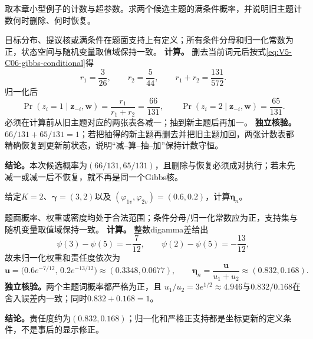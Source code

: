 \label{struct:V5-C06-CH32}
\begin{example}[一次折叠Gibbs更新]\label{exm:V5-C06-gibbs-step}
取本章小型例子的计数与超参数。求两个候选主题的满条件概率，并说明旧主题计数何时删除、何时恢复。
\end{example}
\begin{solution}
\SolGiven 目标分布、提议核或满条件在题面支持上有定义；所有条件分母和归一化常数为正，状态空间与随机变量取值域保持一致。
\SolDerive
\textbf{计算。}
删去当前词元后按式\eqref{eq:V5-C06-gibbs-conditional}得
\[
r_1=\frac3{26},\qquad r_2=\frac5{44},\qquad
r_1+r_2=\frac{131}{572}.
\]
归一化后
\[
\Pr(z_i=1\mid\boldsymbol z_{-i},\boldsymbol w)
=\frac{r_1}{r_1+r_2}=\frac{66}{131},\qquad
\Pr(z_i=2\mid\boldsymbol z_{-i},\boldsymbol w)=\frac{65}{131}.
\]
必须在计算前从旧主题对应的两张表各减一；抽到新主题后再加一。
\textbf{独立核验。}$66/131+65/131=1$；若把抽得的新主题再删去并把旧主题加回，两张计数表都精确恢复到更新前状态，说明“减--算--抽--加”保持计数守恒。

\textbf{结论。}本次候选概率为$(66/131,65/131)$，且删除与恢复必须成对执行；若未先减一或减一后不恢复，就不再是同一个Gibbs核。
\end{solution}
\begin{example}[一次平均场责任度更新]\label{exm:V5-C06-vi-step}
给定$K=2$、$\boldsymbol\gamma=(3,2)$以及
$(\varphi_{1v},\varphi_{2v})=(0.6,0.2)$，计算$\boldsymbol\eta_n$。
\end{example}
\begin{solution}
\SolGiven 题面概率、权重或密度均处于合法范围；条件分母/归一化常数应为正，支持集与随机变量取值域保持一致。
\SolDerive
\textbf{计算。}
整数digamma差给出
\[
\psi(3)-\psi(5)=-\frac7{12},\qquad
\psi(2)-\psi(5)=-\frac{13}{12},
\]
故未归一化权重和责任度依次为
\[
\boldsymbol u
=\bigl(0.6e^{-7/12},\,0.2e^{-13/12}\bigr)
\approx(0.3348,0.0677),\qquad
\boldsymbol\eta_n
=\frac{\boldsymbol u}{u_1+u_2}
\approx(0.832,0.168).
\]
\textbf{独立核验。}两个主题词概率都严格为正，且
$u_1/u_2=3e^{1/2}\approx4.946$与$0.832/0.168$在舍入误差内一致；同时$0.832+0.168=1$。

\textbf{结论。}责任度约为$(0.832,0.168)$；归一化和严格正支持都是坐标更新的定义条件，不是事后的显示修正。
\end{solution}
